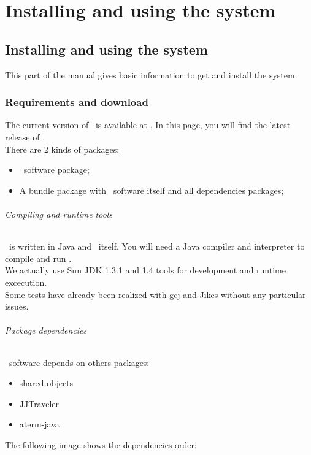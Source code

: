 \part{Installing and using the system}
\chapter{Installing and using the system}
This part of the manual gives basic information to get and install the
system.

\section{Requirements and download}
The current version of \TOM\ is available at .
In this page, you will find the latest release of \TOM.
\\There are 2 kinds of packages:
\begin{itemize}
\item \TOM\ software package;
\item A bundle package with \TOM\ software itself and all dependencies
  packages;
\end{itemize}

\paragraph{Compiling and runtime tools}
\TOM\ is written in Java and \TOM\ itself. You will need a Java
compiler and interpreter to compile and run \TOM. 
\\We actually use Sun JDK 1.3.1 and 1.4 tools for development and runtime
excecution.
\\Some tests have already been realized with gcj
and Jikes without any particular issues.

\paragraph{Package dependencies}
\TOM\ software depends on others packages:
\begin{itemize}
\item shared-objects
\item JJTraveler
\item aterm-java
\end{itemize}
The following image shows the dependencies order:

